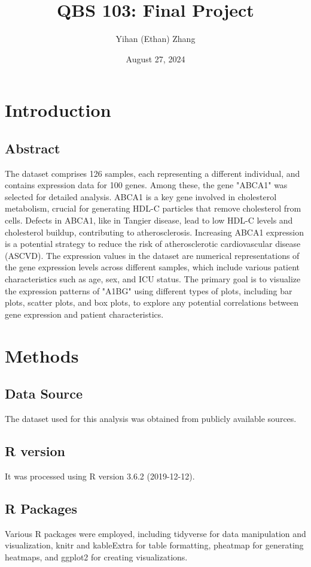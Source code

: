 \documentclass[12pt]{article}
\title{QBS 103: Final Project}
\author{Yihan (Ethan) Zhang}
\date{August 27, 2024}
\begin{document}
\maketitle
\tableofcontents

\newpage
\section{Introduction}
\subsection{Abstract}
The dataset comprises 126 samples, each representing a different individual, and contains expression data for 100 genes. Among these, the gene "ABCA1" was selected for detailed analysis. ABCA1 is a key gene involved in cholesterol metabolism, crucial for generating HDL-C particles that remove cholesterol from cells. Defects in ABCA1, like in Tangier disease, lead to low HDL-C levels and cholesterol buildup, contributing to atherosclerosis. Increasing ABCA1 expression is a potential strategy to reduce the risk of atherosclerotic cardiovascular disease (ASCVD).\cite{Choi2023} The expression values in the dataset are numerical representations of the gene expression levels across different samples, which include various patient characteristics such as age, sex, and ICU status. The primary goal is to visualize the expression patterns of "A1BG" using different types of plots, including bar plots, scatter plots, and box plots, to explore any potential correlations between gene expression and patient characteristics.

\section{Methods}
\subsection{Data Source}
The dataset used for this analysis was obtained from publicly available sources. \cite{Overmyer2021} 
\subsection{R version}
It was processed using R version 3.6.2 (2019-12-12). 
\subsection{R Packages}
Various R packages were employed, including tidyverse for data manipulation and visualization,\cite{Wickham2019} knitr and kableExtra for table formatting,\cite{Zhu2019} pheatmap for generating heatmaps,\cite{Kolde2022} and ggplot2 for creating visualizations.\cite{Tyner2017} 
\end{document}
